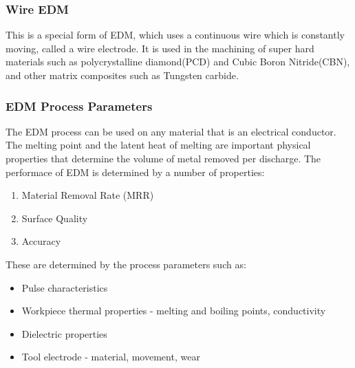 \subsubsection{Wire EDM}
This is a special form of EDM, which uses a continuous wire which is constantly moving, called a wire electrode. It is used in the machining of super hard materials such as polycrystalline diamond(PCD) and Cubic Boron Nitride(CBN), and other matrix composites such as Tungsten carbide.

\subsubsection{EDM Process Parameters}
The EDM process can be used on any material that is an electrical conductor. The melting point and the latent heat of melting are important physical properties that determine the volume of metal removed per discharge.
The performace of EDM is determined by a number of properties\cite{youssef2020non}:
\begin{enumerate}
	\item Material Removal Rate (MRR)
	\item Surface Quality
	\item Accuracy
\end{enumerate}
These are determined by the process parameters such as:
\begin{itemize}
	\item Pulse characteristics
	\item Workpiece thermal properties - melting and boiling points, conductivity
	\item Dielectric properties
	\item Tool electrode - material, movement, wear
\end{itemize}

